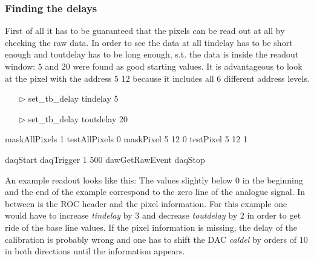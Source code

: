 \subsubsection{Finding the delays}
First of all it has to be guaranteed that the pixels can be read out at all by checking the raw data. In order to see the data at all tindelay has to be short enough and toutdelay has to be long enough, s.t. the data is inside the readout window: $5$ and $20$ were found as good starting values. It is advantageous to look at the pixel with the address $5$ $12$ because it includes all $6$ different address levels.\s
\begin{minipage}{5.5cm}
	\begin{itemize}\ubuntu
		\item[$\triangleright$] set\_tb\_delay tindelay 5
		\item[$\triangleright$] set\_tb\_delay toutdelay 20
	\end{itemize}
\end{minipage}
\no\s
\begin{minipage}{4.2cm}
	\begin{itemize}\ubuntu
		\tri maskAllPixels 1
		\tri testAllPixels 0
		\tri maskPixel 5 12 0
		\tri testPixel 5 12 1
	\end{itemize}
\end{minipage}
\no\s
\begin{minipage}{4.2cm}
	\begin{itemize}\ubuntu
		\tri daqStart 
		\tri daqTrigger 1 500
		\tri dawGetRawEvent
		\tri daqStop
	\end{itemize}
\end{minipage}
\no\s
An example readout looks like this:
\termi{[-3, -19, -9, -193, -1, 96, -55, 58, 108, 164, 212, 93, -4, -6]}
The values slightly below $0$ in the beginning and the end of the example correspond to the zero line of the analogue signal. In between is the \ac{ROC} header and the pixel information. For this example one would have to increase \textit{tindelay} by $3$ and decrease \textit{toutdelay} by $2$ in order to get ride of the base line values. If the pixel information is missing, the delay of the calibration is probably wrong and one has to shift the \ac{DAC} \textit{caldel} by orders of $10$ in both directions until the information appears.
